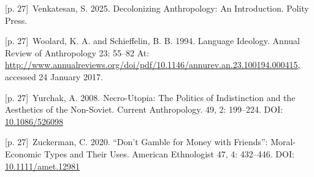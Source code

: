 \documentclass[10pt,a4paper]{article}
\begin{document}
\noindent\begin{minipage}[t]{\linewidth}{\scriptsize\color{gray} [p. 27]}\ Venkatesan, S. 2025. Decolonizing Anthropology: An Introduction. Polity Press.\par\end{minipage}\par
\noindent\begin{minipage}[t]{\linewidth}{\scriptsize\color{gray} [p. 27]}\ Woolard, K. A. and Schieffelin, B. B. 1994. Language Ideology. Annual Review of Anthropology 23: 55–82 At: \url{http://www.annualreviews.org/doi/pdf/10.1146/annurev.an.23.100194.000415,} accessed 24 January 2017.\par\end{minipage}\par
\noindent\begin{minipage}[t]{\linewidth}{\scriptsize\color{gray} [p. 27]}\ Yurchak, A. 2008. Necro-Utopia: The Politics of Indistinction and the Aesthetics of the Non-Soviet. Current Anthropology. 49, 2: 199–224. DOI: \url{10.1086/526098}\par\end{minipage}\par
\noindent\begin{minipage}[t]{\linewidth}{\scriptsize\color{gray} [p. 27]}\ Zuckerman, C. 2020. “Don’t Gamble for Money with Friends”: Moral-Economic Types and Their Uses. American Ethnologist 47, 4: 432–446. DOI: \url{10.1111/amet.12981}\par\end{minipage}\par
\end{document}
